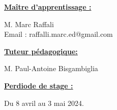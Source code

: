 \vspace*{1cm}
\textbf{\underline{\Large Maître d'apprentissage :}} 
\begin{flushleft}
    \hspace{1cm} M. Marc Raffali \\
    \hspace{1cm} Email : raffalli.marc.ed@gmail.com\\
\end{flushleft}
\vspace{0.8cm}

\textbf{\underline{\Large Tuteur pédagogique:}}  
\begin{flushleft}
    \hspace{1cm} M. Paul-Antoine Bisgambiglia \\
\end{flushleft}
\vspace{0.8cm}

\textbf{\underline{\Large Perdiode de stage :}}  
\begin{flushleft}
    \hspace{1cm} Du 8 avril au 3 mai 2024. \\
\end{flushleft}
